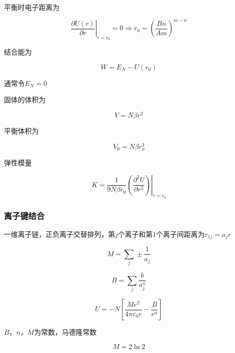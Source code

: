 \documentclass{article}
\begin{document}
\begin{multicols}{2}
平衡时电子距离为

\begin{equation*}
  \left. \dfrac{\partial U \left( r \right) }{\partial r} \right|_{r=r_0} = 0
  \Rightarrow
  r_0 = \left( \dfrac{Bn}{Am} \right)^{m-n}
\end{equation*}

结合能为

\begin{equation*}
  W = E_N - U \left( r_0 \right)
\end{equation*}

通常令$E_N=0$

固体的体积为

\begin{equation*}
  V = N \beta r^3
\end{equation*}

平衡体积为

\begin{equation*}
  V_0 = N \beta r_0^3
\end{equation*}

弹性模量

\begin{equation*}
  K = \left. \dfrac{1}{9N\beta r_{0}} \left( \dfrac{\partial^{2} U}{\partial r^2} \right)\right|_{r=r_0}
\end{equation*}

\subsubsection{离子键结合}

一维离子链，正负离子交替排列，第$j$个离子和第$1$个离子间距离为$r_{1j}=a_jr$

\begin{equation*}
  M = \sum_j \pm \dfrac{1}{a_j}
\end{equation*}

\begin{equation*}
  B = \sum_j \dfrac{b}{a_j^n}
\end{equation*}

\begin{equation*}
  U = - N \left[ \dfrac{Me^{2}}{4\pi \varepsilon_{0} r} - \dfrac{B}{r^{n}} \right]
\end{equation*}

$B$，$n$，$M$为常数，马德隆常数

\begin{equation*}
  M = 2 \ln 2
\end{equation*}


\end{multicols}
\end{document}
